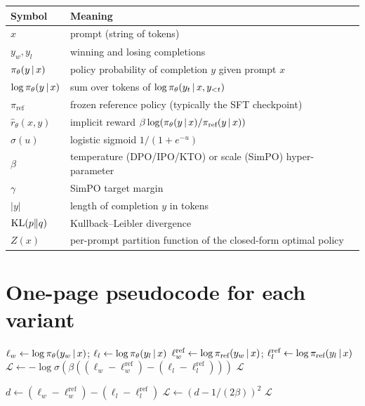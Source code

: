\documentclass[11pt,oneside]{scrbook}
\begin{document}
\begin{center}
\small
\begin{tabular}{ll}
\toprule
Symbol & Meaning \\
\midrule
$x$ & prompt (string of tokens) \\
$y_w, y_l$ & winning and losing completions \\
$\pi_\theta(y \,\vert\, x)$ & policy probability of completion $y$ given prompt $x$ \\
$\log\pi_\theta(y \,\vert\, x)$ & sum over tokens of $\log\pi_\theta(y_t \,\vert\, x, y_{<t})$ \\
$\pi_{\text{ref}}$ & frozen reference policy (typically the SFT checkpoint) \\
$\hat r_\theta(x, y)$ & implicit reward $\beta\log(\pi_\theta(y \,\vert\, x)/\pi_{\text{ref}}(y \,\vert\, x))$ \\
$\sigma(u)$ & logistic sigmoid $1/(1+e^{-u})$ \\
$\beta$ & temperature (DPO/IPO/KTO) or scale (SimPO) hyper-parameter \\
$\gamma$ & SimPO target margin \\
$|y|$ & length of completion $y$ in tokens \\
$\mathrm{KL}(p \| q)$ & Kullback--Leibler divergence \\
$Z(x)$ & per-prompt partition function of the closed-form optimal policy \\
\bottomrule
\end{tabular}
\end{center}

\section{One-page pseudocode for each variant}

\begin{algorithm}[H]
\SetAlgoLined\DontPrintSemicolon
{}
$\ell_w \gets \log\pi_\theta(y_w \,\vert\, x)$;\quad
$\ell_l \gets \log\pi_\theta(y_l \,\vert\, x)$ \;
$\ell_w^{\text{ref}} \gets \log\pi_{\text{ref}}(y_w \,\vert\, x)$;\quad
$\ell_l^{\text{ref}} \gets \log\pi_{\text{ref}}(y_l \,\vert\, x)$ \;
$\mathcal{L} \gets - \log\sigma(\beta((\ell_w - \ell_w^{\text{ref}}) - (\ell_l - \ell_l^{\text{ref}})))$ \;
\Return $\mathcal{L}$ \;
\caption{DPO step.}
\end{algorithm}

\begin{algorithm}[H]
\SetAlgoLined\DontPrintSemicolon
{}
$d \gets (\ell_w - \ell_w^{\text{ref}}) - (\ell_l - \ell_l^{\text{ref}})$ \;
$\mathcal{L} \gets (d - 1/(2\beta))^2$ \;
\Return $\mathcal{L}$ \;
\caption{IPO step.}
\end{algorithm}
\end{document}
